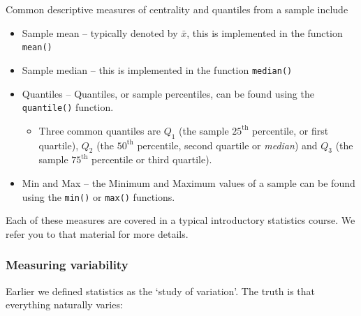 \documentclass[
]{book}
\providecommand{\tightlist}{%
  \setlength{\itemsep}{0pt}\setlength{\parskip}{0pt}}
\begin{document}
Common descriptive measures of centrality and quantiles from a sample include

\begin{itemize}
\tightlist
\item
  Sample mean -- typically denoted by \(\bar{x}\), this is implemented in the function \texttt{mean()}
\item
  Sample median -- this is implemented in the function \texttt{median()}
\item
  Quantiles -- Quantiles, or sample percentiles, can be found using the \texttt{quantile()} function.

  \begin{itemize}
  \tightlist
  \item
    Three common quantiles are \(Q_1\) (the sample \(25^\mathrm{th}\) percentile, or first quartile), \(Q_2\) (the \(50^\mathrm{th}\) percentile, second quartile or \emph{median}) and \(Q_3\) (the sample \(75^\mathrm{th}\) percentile or third quartile).
  \end{itemize}
\item
  Min and Max -- the Minimum and Maximum values of a sample can be found using the \texttt{min()} or \texttt{max()} functions.
\end{itemize}

Each of these measures are covered in a typical introductory statistics course. We refer you to that material for more details.

\hypertarget{variabilityDiscussion}{%
\subsubsection{Measuring variability}\label{variabilityDiscussion}}

Earlier we defined statistics as the `study of variation'. The truth is that everything naturally varies:
\end{document}
